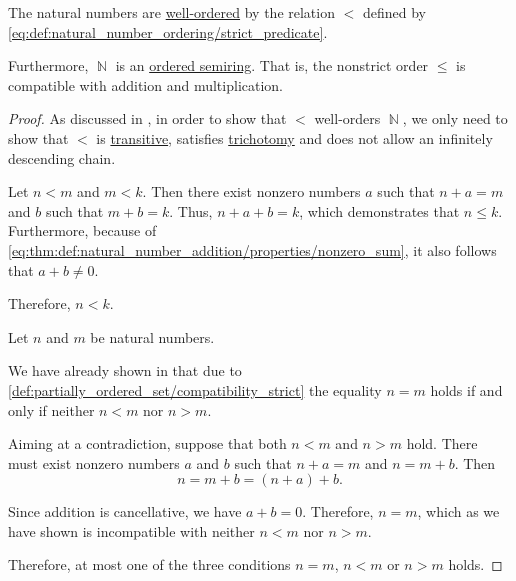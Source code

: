\begin{proposition}\label{thm:natural_numbers_are_well_ordered}
  The natural numbers are \hyperref[def:well_ordered_set]{well-ordered} by the relation \( < \) defined by \eqref{eq:def:natural_number_ordering/strict_predicate}.

  Furthermore, \( \BbbN \) is an \hyperref[def:ordered_semiring]{ordered semiring}. That is, the nonstrict order \( \leq \) is compatible with addition and multiplication.
\end{proposition}
\begin{proof}
  As discussed in , in order to show that \( < \) well-orders \( \BbbN \), we only need to show that \( < \) is \hyperref[def:binary_relation/transitive]{transitive}, satisfies \hyperref[def:binary_relation/trichotomic]{trichotomy} and does not allow an infinitely descending chain.

   Let \( n < m \) and \( m < k \). Then there exist nonzero numbers \( a \) such that \( n + a = m \) and \( b \) such that \( m + b = k \). Thus, \( n + a + b = k \), which demonstrates that \( n \leq k \). Furthermore, because of \eqref{eq:thm:def:natural_number_addition/properties/nonzero_sum}, it also follows that \( a + b \neq 0 \).

  Therefore, \( n < k \).

   Let \( n \) and \( m \) be natural numbers.

  We have already shown in  that due to \eqref{def:partially_ordered_set/compatibility_strict} the equality \( n = m \) holds if and only if neither \( n < m \) nor \( n > m \).

  Aiming at a contradiction, suppose that both \( n < m \) and \( n > m \) hold. There must exist nonzero numbers \( a \) and \( b \) such that \( n + a = m \) and \( n = m + b \). Then
  \begin{equation*}
    n = m + b = (n + a) + b.
  \end{equation*}

  Since addition is cancellative, we have \( a + b = 0 \). Therefore, \( n = m \), which as we have shown is incompatible with neither \( n < m \) nor \( n > m \).

  Therefore, at most one of the three conditions \( n = m \), \( n < m \) or \( n > m \) holds.


\end{proof}
